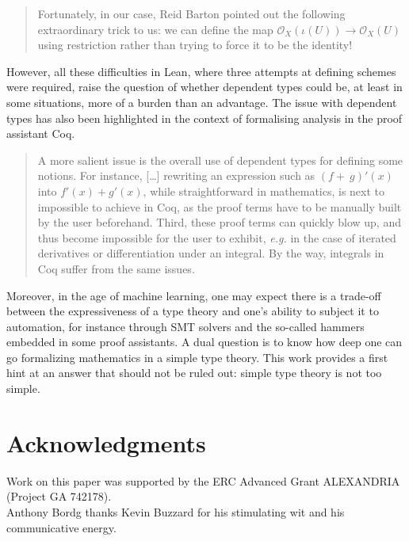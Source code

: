\documentclass[12pt]{scrartcl}
\begin{document}
\begin{quote}
	Fortunately, in our case, Reid Barton pointed out the following extraordinary trick to us: we can define the map $\mathscr{O}_X(\iota(U)) \rightarrow \mathscr{O}_X(U)$ using restriction rather than trying to force it to be the identity! \cite[3.5.]{schemesinLean}
\end{quote}	    
However, all these difficulties in Lean, where three attempts at defining schemes were required, raise the question of whether dependent types could be, at least in some situations, more of a burden than an advantage. The issue with dependent types has also been highlighted in the context of formalising analysis in the proof assistant Coq.
\begin{quote}
	A more salient issue is the overall use of dependent types for defining some notions. For instance, [\dots] rewriting an expression such as $(f+~g)'(x)$ into $f'(x)+g'(x)$, while straightforward in mathematics, is next to impossible to achieve in Coq, as the proof terms have to be manually built by the user beforehand. Third, these proof terms can quickly blow up, and thus become impossible for the user to exhibit, \textit{e.g.} in the case of iterated derivatives or differentiation under an integral. By the way, integrals in Coq suffer from the same issues. \cite[1.]{boldo2015coquelicot}
\end{quote}	 
Moreover, in the age of machine learning, one may expect there is a trade-off between the expressiveness of a type theory and one's ability to subject it to automation, for instance through SMT solvers and the so-called hammers embedded in some proof assistants. A dual question is to know how deep one can go formalizing mathematics in a simple type theory. This work provides a first hint at an answer that should not be ruled out: simple type theory is not too simple.        

\section*{Acknowledgments}

Work on this paper was supported by the ERC Advanced Grant ALEXANDRIA (Project GA 742178).  \\
Anthony Bordg thanks Kevin Buzzard for his stimulating wit and his communicative energy.			



\end{document}
